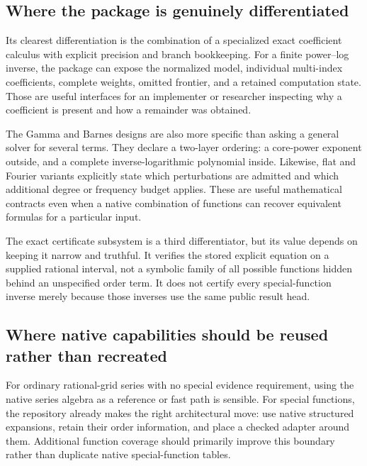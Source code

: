\documentclass[11pt,a4paper]{article}
\theoremstyle{definition}
\begin{document}
\subsection{Where the package is genuinely differentiated}

Its clearest differentiation is the combination of a specialized exact coefficient calculus with explicit precision and branch bookkeeping. For a finite power--log inverse, the package can expose the normalized model, individual multi-index coefficients, complete weights, omitted frontier, and a retained computation state. Those are useful interfaces for an implementer or researcher inspecting why a coefficient is present and how a remainder was obtained.\cite{core,incremental,refinement}

The Gamma and Barnes designs are also more specific than asking a general solver for several terms. They declare a two-layer ordering: a core-power exponent outside, and a complete inverse-logarithmic polynomial inside. Likewise, flat and Fourier variants explicitly state which perturbations are admitted and which additional degree or frequency budget applies. These are useful mathematical contracts even when a native combination of functions can recover equivalent formulas for a particular input.\cite{gammainverse,barnesinverse,flat,fourier}

The exact certificate subsystem is a third differentiator, but its value depends on keeping it narrow and truthful. It verifies the stored explicit equation on a supplied rational interval, not a symbolic family of all possible functions hidden behind an unspecified order term. It does not certify every special-function inverse merely because those inverses use the same public result head.\cite{certificates}

\subsection{Where native capabilities should be reused rather than recreated}

For ordinary rational-grid series with no special evidence requirement, using the native series algebra as a reference or fast path is sensible. For special functions, the repository already makes the right architectural move: use native structured expansions, retain their order information, and place a checked adapter around them. Additional function coverage should primarily improve this boundary rather than duplicate native special-function tables.\cite{native}
\end{document}
